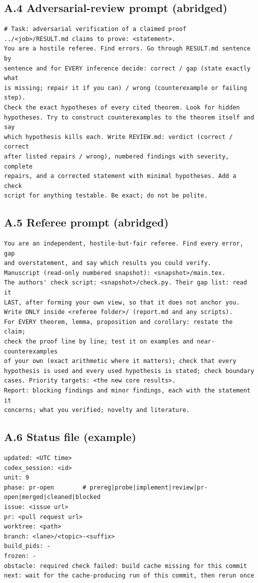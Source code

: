 \documentclass[11pt]{article}
\begin{document}
\subsection*{A.4 Adversarial-review prompt (abridged)}
\begin{small}
\begin{verbatim}
# Task: adversarial verification of a claimed proof
../<job>/RESULT.md claims to prove: <statement>.
You are a hostile referee. Find errors. Go through RESULT.md sentence by
sentence and for EVERY inference decide: correct / gap (state exactly what
is missing; repair it if you can) / wrong (counterexample or failing step).
Check the exact hypotheses of every cited theorem. Look for hidden
hypotheses. Try to construct counterexamples to the theorem itself and say
which hypothesis kills each. Write REVIEW.md: verdict (correct / correct
after listed repairs / wrong), numbered findings with severity, complete
repairs, and a corrected statement with minimal hypotheses. Add a check
script for anything testable. Be exact; do not be polite.
\end{verbatim}
\end{small}

\subsection*{A.5 Referee prompt (abridged)}
\begin{small}
\begin{verbatim}
You are an independent, hostile-but-fair referee. Find every error, gap
and overstatement, and say which results you could verify.
Manuscript (read-only numbered snapshot): <snapshot>/main.tex.
The authors' check script: <snapshot>/check.py. Their gap list: read it
LAST, after forming your own view, so that it does not anchor you.
Write ONLY inside <referee folder>/ (report.md and any scripts).
For EVERY theorem, lemma, proposition and corollary: restate the claim;
check the proof line by line; test it on examples and near-counterexamples
of your own (exact arithmetic where it matters); check that every
hypothesis is used and every used hypothesis is stated; check boundary
cases. Priority targets: <the new core results>.
Report: blocking findings and minor findings, each with the statement it
concerns; what you verified; novelty and literature.
\end{verbatim}
\end{small}

\subsection*{A.6 Status file (example)}
\begin{small}
\begin{verbatim}
updated: <UTC time>
codex_session: <id>
unit: 9
phase: pr-open        # prereg|probe|implement|review|pr-open|merged|cleaned|blocked
issue: <issue url>
pr: <pull request url>
worktree: <path>
branch: <lane>/<topic>-<suffix>
build_pids: -
frozen: -
obstacle: required check failed: build cache missing for this commit
next: wait for the cache-producing run of this commit, then rerun once
\end{verbatim}
\end{small}
\end{document}
